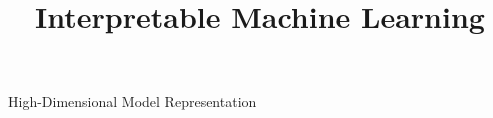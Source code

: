 \documentclass[11pt,compress,t,notes=noshow, aspectratio=169, xcolor=table]{beamer}
\title{Interpretable Machine Learning}
\date{}
\begin{document}
\newcommand{\titlefigure}{figure/open_blackbox}
\newcommand{\learninggoals}{
\item What are additive decomposition of prediction functions?
\item Why are they useful?
\item How do we obtain them?}

 
\begin{frame}{High-Dimensional Model Representation \\ 
}


\end{frame}
\end{document}

